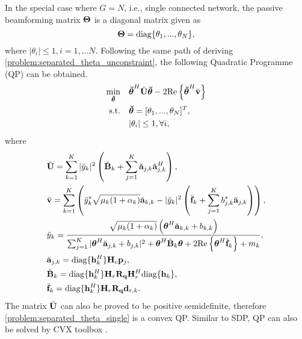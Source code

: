 In the special case where $G = N$, i.e., single connected network, the passive beamforming matrix ${\bf \Theta}$ is a diagonal matrix
given as 
\begin{equation}
    {\bf \Theta} = \mathrm{diag} \{ \theta_1,...,\theta_N \},
\end{equation}
where $|\theta_i| \leq 1, i=1,...N$. Following the same path of deriving \eqref{problem:separated_theta_unconstraint}, the following Quadratic Programme (QP)
can be obtained.
\begin{subequations} \label{problem:separated_theta_single}
    \begin{align}
        \min_{\boldsymbol{\breve \theta}} \quad & \boldsymbol{\breve \theta}^H \breve{\bf U} \boldsymbol{\breve \theta} - 2 \mathrm{Re} \left\{ \boldsymbol{\breve \theta}^H \breve{\bf v} \right\}\\  
        \mathrm{s.t.} \quad &  \boldsymbol{\breve \theta} = [\theta_1,...,\theta_N]^T,
        \\ &|\theta_i| \leq 1, \forall i,
    \end{align}
\end{subequations}
where 
\begin{align}
    &\breve{\bf U} = \sum_{k=1}^K |\breve{y}_k|^2 \left(\breve{\bf B}_k + \sum_{j=1}^K \breve{\bf a}_{j,k} \breve{\bf a}_{j,k}^H  \right), \\
    &\breve{\bf v} = \sum_{k=1}^K \left( \breve{y}_k^* \sqrt{\mu_k(1+\alpha_k)} \breve{\bf a}_{k,k} - |\breve{y}_k|^2 \left( \breve{\bf f}_k + \sum_{j=1}^K b_{j,k}^* \breve{\bf a}_{j,k} \right) \right), \\
    \label{eqn:separated_optimal_y_single}
    &\breve{y}_k = \frac{\sqrt{\mu_k (1+\alpha_k)} \left(\boldsymbol{\theta}^H \breve{\bf a}_{k,k} + b_{k,k} \right)}{\sum_{j=1}^K |\boldsymbol{\theta}^H \breve{\bf a}_{j,k} + b_{j,k}|^2 + \boldsymbol{\theta}^H \breve{\bf B}_k \boldsymbol{\theta} + 2 \mathrm{Re} \left\{ \boldsymbol{\theta}^H \breve{\bf f}_k \right\} + m_k},\\
    &\breve{\bf{a}}_{j,k}=\mathrm{diag}\{\mathbf{h}_k^H\} \mathbf{H}_c \mathbf{p}_j, \\
    &\breve{\bf{B}}_k=\mathrm{diag}\{\mathbf{h}_k^H\}\mathbf{H}_r \mathbf{R}_{\bf q} \mathbf{H}_r^H\mathrm{diag}\{\mathbf{h}_k\}, \\
    &\breve{\bf f}_k = \mathrm{diag} \{{\bf h}_k^H\} {\bf H}_r {\bf R}_{\bf q} {\bf d}_{r,k}.\\
\end{align}
The matrix $\breve{\bf U}$ can also be proved to be positive semidefinite, therefore \eqref{problem:separated_theta_single} is a convex QP.
Similar to SDP, QP can also be solved by CVX toolbox \cite{cvx}. 

